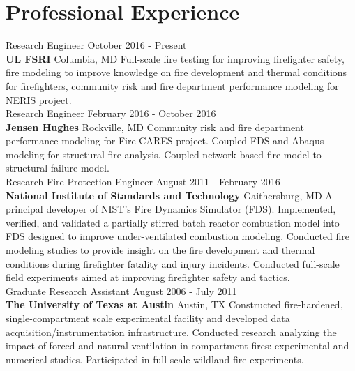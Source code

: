\documentclass[10pt,letterpaper]{article}
\begin{document}
\section*{Professional Experience}
Research Engineer \hfill October 2016 - Present \\
{\bf UL FSRI} \hfill Columbia, MD \vskip3pt
Full-scale fire testing for improving firefighter safety, fire modeling to improve knowledge on fire development and thermal conditions for firefighters, community risk and fire department performance modeling for NERIS project. \\

Research Engineer \hfill February 2016 - October 2016 \\
{\bf Jensen Hughes} \hfill Rockville, MD \vskip3pt
Community risk and fire department performance modeling for Fire CARES project. Coupled FDS and Abaqus modeling for structural fire analysis. Coupled network-based fire model to structural failure model.\\

Research Fire Protection Engineer \hfill August 2011 - February 2016 \\
{\bf National Institute of Standards and Technology} \hfill Gaithersburg, MD \vskip3pt
A principal developer of NIST's Fire Dynamics Simulator (FDS). Implemented, verified, and validated a partially stirred batch reactor combustion model into FDS designed to improve under-ventilated combustion modeling. Conducted fire modeling studies to provide insight on the fire development and thermal conditions during firefighter fatality and injury incidents. Conducted full-scale field experiments aimed at improving firefighter safety and tactics. \\

Graduate Research Assistant \hfill August 2006 - July 2011 \\
{\bf The University of Texas at Austin} \hfill Austin, TX \vskip3pt
Constructed fire-hardened, single-compartment scale experimental facility and developed data acquisition/instrumentation infrastructure. Conducted research analyzing the impact of forced and natural ventilation in compartment fires: experimental and numerical studies. Participated in full-scale wildland fire experiments. \\

\end{document}
